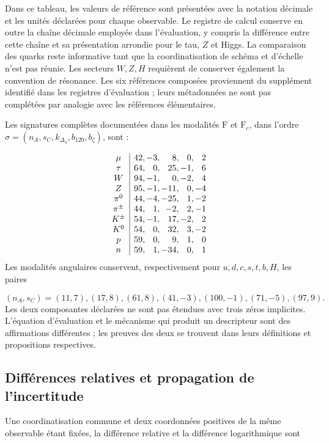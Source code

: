 Dans ce tableau, les valeurs de référence sont présentées avec la notation
décimale et les unités déclarées pour chaque observable. Le registre de
calcul conserve en outre la chaîne décimale employée dans l’évaluation,
y compris la différence entre cette chaîne et sa présentation arrondie pour
le tau, \(Z\) et Higgs. La comparaison des quarks
reste informative tant que la coordinatisation de schéma et d’échelle n’est pas réunie.
Les secteurs \(W,Z,H\) requièrent de conserver également la convention de
résonance. Les six références composées proviennent du supplément
identifié dans les registres d’évaluation ; leurs métadonnées ne sont pas complétées
par analogie avec les références élémentaires.


Les signatures complètes documentées dans les modalités \(\mathrm F\) et
\(\mathrm F_c\), dans l’ordre\linebreak
\(\sigma=(n_A,s_C,k_{\Delta_4},b_{120},b_\zeta)\), sont :

\[
\begin{array}{c|r@{,\,}r@{,\,}r@{,\,}r@{,\,}r}
\mu&42&-3&8&0&2\\
\tau&64&0&25&-1&6\\
W&94&-1&0&-2&4\\
Z&95&-1&-11&0&-4\\
\pi^0&44&-4&-25&1&-2\\
\pi^\pm&44&1&-2&2&-1\\
K^\pm&54&-1&17&-2&2\\
K^0&54&0&32&3&-2\\
p&59&0&9&1&0\\
n&59&1&-34&0&1
\end{array}
\]
Les modalités angulaires conservent, respectivement pour
\(u,d,c,s,t,b,H\), les paires

\[
(n_A,s_C)=(11,7),(17,8),(61,8),(41,-3),(100,-1),(71,-5),(97,9).
\]
Les deux composantes déclarées ne sont pas étendues avec
trois zéros implicites. L’équation d’évaluation et le mécanisme qui
produit un descripteur sont des affirmations différentes ; les preuves des deux
se trouvent dans leurs définitions et propositions respectives.


\subsection{Différences relatives et propagation de l’incertitude
}
\label{subsec:vi-residuales}

Une coordinatisation commune et deux coordonnées positives de la même observable étant fixées,
la différence relative et la différence logarithmique sont

